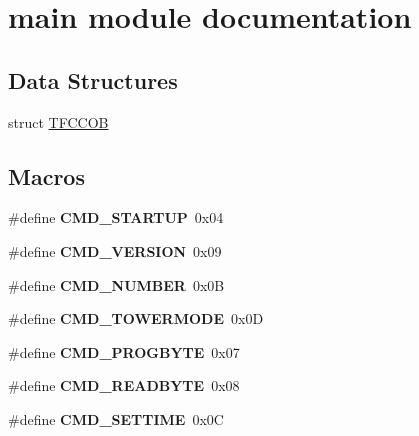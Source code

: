 \hypertarget{group__main__module}{}\section{main module documentation}
\label{group__main__module}
\subsection*{Data Structures}
\begin{DoxyCompactItemize}
\item 
struct \hyperlink{struct_t_f_c_c_o_b}{T\+F\+C\+C\+OB}
\end{DoxyCompactItemize}
\subsection*{Macros}
\begin{DoxyCompactItemize}
\item 
\mbox{\label{group__main__module_gafd55a272ed701c0ea1caa8922fd4ded0}} 
\#define {\bfseries C\+M\+D\+\_\+\+S\+T\+A\+R\+T\+UP}~0x04
\item 
\mbox{\label{group__main__module_gad64394fffb2b4f7b396494845b7a3508}} 
\#define {\bfseries C\+M\+D\+\_\+\+V\+E\+R\+S\+I\+ON}~0x09
\item 
\mbox{\label{group__main__module_gadf6ad766e0645b5b40eb5480a93ea583}} 
\#define {\bfseries C\+M\+D\+\_\+\+N\+U\+M\+B\+ER}~0x0B
\item 
\mbox{\label{group__main__module_gab4efbe07fba04914334f45f97ac0af54}} 
\#define {\bfseries C\+M\+D\+\_\+\+T\+O\+W\+E\+R\+M\+O\+DE}~0x0D
\item 
\mbox{\label{group__main__module_ga64d88c2acf5d0158f4c75cceaca1bfde}} 
\#define {\bfseries C\+M\+D\+\_\+\+P\+R\+O\+G\+B\+Y\+TE}~0x07
\item 
\mbox{\label{group__main__module_ga439105059cfaa05782eaf0a771e852ce}} 
\#define {\bfseries C\+M\+D\+\_\+\+R\+E\+A\+D\+B\+Y\+TE}~0x08
\item 
\mbox{\label{group__main__module_ga47228d2cc78c94dbd415570de4f9bc7b}} 
\#define {\bfseries C\+M\+D\+\_\+\+S\+E\+T\+T\+I\+ME}~0x0C
\end{DoxyCompactItemize}
